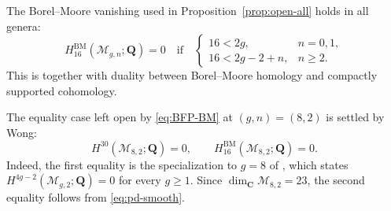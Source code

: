 \documentclass[12pt,reqno]{amsart}
\newcommand{\Q}{\mathbf{Q}}
\newcommand{\C}{\mathbf{C}}
\newcommand{\M}{\mathcal{M}}
\newcommand{\BM}{\mathrm{BM}}
\theoremstyle{definition}
\theoremstyle{remark}
\begin{document}
The Borel--Moore vanishing used in Proposition~\ref{prop:open-all} holds in
all genera:
\begin{equation}\label{eq:BFP-BM}
 H_{16}^{\BM}(\M_{g,n};\Q)=0
 \quad\text{if}\quad
 \begin{cases}
 16<2g,&n=0,1,\\
 16<2g-2+n,&n\geq2.
 \end{cases}
\end{equation}
This is \cite[Proposition~2.1]{BFP} together with duality between
Borel--Moore homology and compactly supported cohomology.

The equality case left open by \eqref{eq:BFP-BM} at $(g,n)=(8,2)$ is
settled by Wong:
\begin{equation}\label{eq:wong-82}
 H^{30}(\M_{8,2};\Q)=0,
 \qquad H_{16}^{\BM}(\M_{8,2};\Q)=0.
\end{equation}
Indeed, the first equality is the specialization to $g=8$ of
\cite[Theorem~4.1]{Wong}, which states
$H^{4g-2}(\M_{g,2};\Q)=0$ for every $g\geq1$.  Since
$\dim_{\C}\M_{8,2}=23$, the second equality follows from
\eqref{eq:pd-smooth}.
\end{document}
